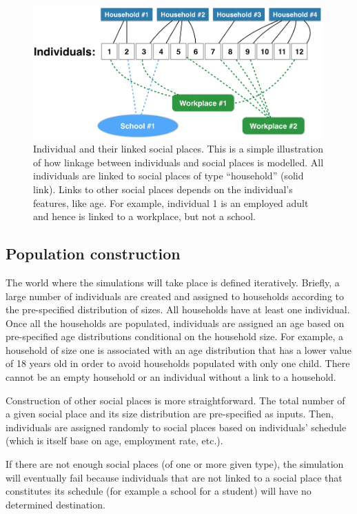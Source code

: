 \documentclass[11pt, onecolumn]{article}
\begin{document}
\begin{figure}[!ht]
\centering
    \includegraphics[angle=0,width=0.99\textwidth]{figures/SP_indiv.png}
\caption{Individual and their linked social places. This is a simple illustration of how linkage between individuals and social places is modelled. All individuals are linked to social places of type ``household'' (solid link). Links to other social places depends on the individual's features, like age. For example, individual 1 is an employed adult and hence is linked to a workplace, but not a school.}
\label{fig:SP_indiv}
\end{figure}


\subsection{Population construction}

The world where the simulations will take place is defined iteratively. Briefly, a large number of individuals are created and assigned to households according to the pre-specified distribution of sizes. All households have at least one individual. Once all the households are populated, individuals are assigned an age based on pre-specified age distributions conditional on the household size. For example, a household of size one is associated with an age distribution that has a lower value of 18 years old in order to avoid households populated with only one child. There cannot be an empty household or an individual without a link to a household.

Construction of other social places is more straightforward. The total number of a given social place and its size distribution are pre-specified as inputs. 
Then, individuals are assigned randomly to social places based on individuals' schedule (which is itself base on age, employment rate, etc.). 

If there are not enough social places (of one or more given type), the simulation will eventually fail because individuals that are not linked to a social place that constitutes its schedule (for example a school for a student) will have no determined destination. 
\end{document}
